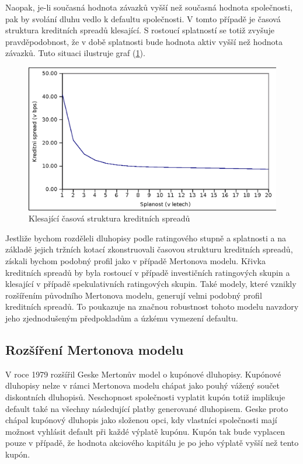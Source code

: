 \documentclass[a4paper]{book}
\begin{document}
Naopak, je-li současná hodnota závazků vyšší než současná hodnota společnosti, pak by svolání dluhu vedlo k defaultu společnosti. V tomto případě je časová struktura kreditních spreadů klesající. S rostoucí splatností se totiž zvyšuje pravděpodobnost, že v době splatnosti bude hodnota aktiv vyšší než hodnota závazků. Tuto situaci ilustruje graf (\ref{credit_spread_2}).
\begin{figure}
  \centering
  \includegraphics[bb=0 0 350 250]{credit_spread_2.eps}
  \caption{Klesající časová struktura kreditních spreadů}
  \label{credit_spread_2}
\end{figure}

Jestliže bychom rozděleli dluhopisy podle ratingového stupně a splatnosti a na základě jejich tržních kotací zkonstruovali časovou strukturu kreditních spreadů, získali bychom podobný profil jako v případě Mertonova modelu. Křivka kreditních spreadů by byla rostoucí v případě investičních ratingových skupin a klesající v případě spekulativních ratingových skupin. Také modely, které vznikly rozšířením původního Mertonova modelu, generují velmi podobný profil kreditních spreadů. To poukazuje na značnou robustnost tohoto modelu navzdory jeho zjednodušeným předpokladům a úzkému vymezení defaultu. 

\subsection{Rozšíření Mertonova modelu}

V roce 1979 rozšířil Geske Mertonův model o kupónové dluhopisy. Kupónové dluhopisy nelze v rámci Mertonova modelu chápat jako pouhý vážený součet diskontních dluhopisů. Neschopnost společnosti vyplatit kupón totiž implikuje default také na všechny následující platby generované dluhopisem. Geske proto chápal kupónový dluhopis jako složenou opci, kdy vlastníci společnosti mají možnost vyhlásit default při každé výplatě kupónu. Kupón tak bude vyplacen pouze v případě, že hodnota akciového kapitálu je po jeho výplatě vyšší než tento kupón.
\end{document}

